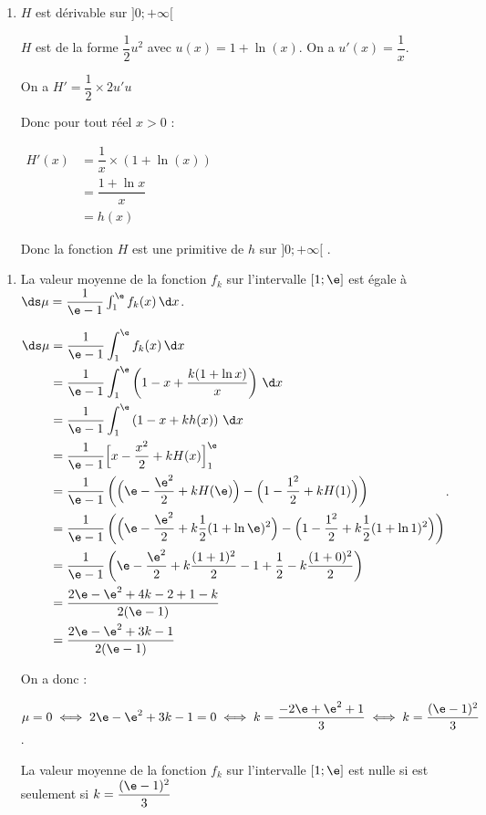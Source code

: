\begin{enumerate}
	\item 
	
	$H$ est dérivable sur $] 0 ;+\infty[$ 
	
	$H$ est de la forme $\dfrac{1}{2}u^2$ avec $u(x) = 1 + \ln(x)$. On a  $u'(x) = \dfrac{1}{x}$. 
	
	On a $H'= \dfrac{1}{2} \times 2 u'u $ 
	
	Donc pour tout réel $x>0$ : 
	
	$\begin{aligned} H'(x) &= \dfrac{1}{x} \times \left(1 + \ln(x) \right) \\
		&= \dfrac{1+\ln x}{x} \\
		&=h(x)
		\end{aligned}$	
		
		Donc la fonction $H$ est une primitive de $h$ sur $] 0 ;+\infty[$ . 
	
	
\end{enumerate}



\begin{enumerate}[resume]
	\item La valeur moyenne de la fonction $f_{k}$ sur l'intervalle $[ 1 ; \e]$ est égale à $\ds \mu= \dfrac{1}{\e-1} \int_1^{\e} f_k(x) \,\d x$. 
	
	
	
	$\begin{aligned}  \ds \mu& = \dfrac{1}{\e-1} \int_1^{\e} f_k(x) \,\d x\\
		&= \dfrac{1}{\e-1} \int_1^{\e}   \left(1-x+\dfrac{k(1+\ln x)}{x}  \right)\,\d x\\
		&= \dfrac{1}{\e-1} \int_1^{\e}   \left(1-x+kh(x)  \right)\,\d x\\
		&= \dfrac{1}{\e-1} \Big[x-\dfrac{x^2}{2} + kH(x)\Big]_1^{\e} \\
		&= \dfrac{1}{\e-1} \left( \Big(\e-\dfrac{\e^2}{2} + kH(\e)\Big) -  \Big(1-\dfrac{1^2}{2} + kH(1)\Big)  \right) \\
		&= \dfrac{1}{\e-1} \left( \Big(\e-\dfrac{\e^2}{2} + k\dfrac{1}{2}(1+\ln \e)^{2} \Big) -  \Big(1-\dfrac{1^2}{2} + k\dfrac{1}{2}(1+\ln 1)^{2}\Big)  \right) \\
			&= \dfrac{1}{\e-1} \left( \e-\dfrac{\e^2}{2} + k\dfrac{(1+1)^2}{2} -  1+\dfrac{1}{2} - k\dfrac{(1+0)^2}{2}\right) \\
		&= \dfrac{ 2\e-\e^2 + 4k -  2+1- k}{2(\e-1)}\\
			&= \dfrac{ 2\e-\e^2 + 3k -  1}{2(\e-1)}\\
		\end{aligned}$.
	
	
	
	
On a donc : 

$\mu =0 \iff 2\e-\e^2 + 3k -  1 =0 \iff   k= \dfrac{-2\e+\e^2 +   1}{3} \iff k= \dfrac{(\e-1)^2}{3}$. 


	
	La valeur moyenne de la fonction $f_{k}$ sur l'intervalle $[ 1 ; \e]$ est  nulle si est seulement si $k=   \dfrac{(\e-1)^2}{3}$
\end{enumerate}
